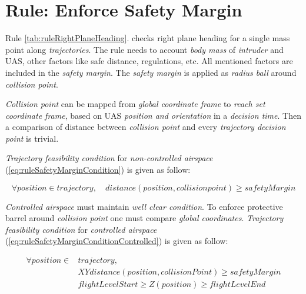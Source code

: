 \section{Rule: Enforce Safety Margin}\label{sec:ruleEnforceSafetyMargin}
\noindent Rule \ref{tab:ruleRightPlaneHeading}. checks right plane heading for a single mass point along \emph{trajectories}. The rule needs to account \emph{body mass} of \emph{intruder} and UAS, other factors like safe distance, regulations, etc. All mentioned factors are included in the \emph{safety margin}. The \emph{safety margin} is applied as \emph{radius ball} around \emph{collision point}. 

\emph{Collision point} can be mapped from \emph{global coordinate frame} to \emph{reach set coordinate frame}, based on UAS \emph{position and orientation} in a \emph{decision time}. Then a comparison of distance between \emph{collision point} and every \emph{trajectory decision point} is trivial. 

\emph{Trajectory feasibility condition}  for \emph{non-controlled airspace} (\ref{eq:ruleSafetyMarginCondition}) is given as follow:

\begin{equation}\label{eq:ruleSafetyMarginCondition}
    \forall position \in trajectory, \quad distance(position,collision point) \ge safetyMargin
\end{equation}

\noindent\emph{Controlled airspace} must maintain \emph{well clear condition}. To enforce protective barrel around \emph{collision point} one must compare \emph{global coordinates}.
\emph{Trajectory feasibility condition}  for \emph{controlled airspace} (\ref{eq:ruleSafetyMarginConditionControlled}) is given as follow:

\begin{equation}\label{eq:ruleSafetyMarginConditionControlled}
    \begin{aligned}
        \forall position \in &trajectory,\\
        &XYdistance(position,collisionPoint) \ge safetyMargin\\
        &flightLevelStart \ge Z(position) \ge flightLevelEnd
    \end{aligned}
\end{equation}

